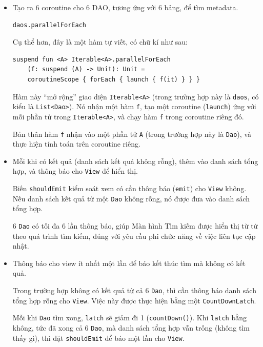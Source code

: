 \documentclass[../../thesis]{subfiles}
\begin{document}
\begin{itemize}
    \item
        Tạo ra 6 coroutine cho 6 DAO, tương ứng với 6 bảng, để tìm metadata.

        \begin{verbatim}
daos.parallelForEach
        \end{verbatim}

        Cụ thể hơn, đây là một hàm tự viết, có chữ kí như sau:

        \begin{verbatim}
suspend fun <A> Iterable<A>.parallelForEach
    (f: suspend (A) -> Unit): Unit =
    coroutineScope { forEach { launch { f(it) } } }
        \end{verbatim}

        Hàm này ``mở rộng'' giao diện \texttt{Iterable<A>} (trong trường hợp này
        là \texttt{daos}, có kiểu là \texttt{List<Dao>}). Nó nhận một hàm
        \texttt{f}, tạo một coroutine (\texttt{launch}) ứng với mỗi phần tử
        trong \texttt{Iterable<A>}, và chạy hàm \texttt{f} trong coroutine riêng
        đó.

        Bản thân hàm \texttt{f} nhận vào một phần tử \texttt{A} (trong trường
        hợp này là \texttt{Dao}), và thực hiện tính toán trên coroutine riêng.
    \item
        Mỗi khi có kết quả (danh sách kết quả không rỗng), thêm vào danh sách
        tổng hợp, và thông báo cho \texttt{View} để hiển thị.

        Biến \texttt{shouldEmit} kiểm soát xem có cần thông báo (\texttt{emit})
        cho \texttt{View} không. Nếu danh sách kết quả từ một \texttt{Dao} không
        rỗng, nó được đưa vào danh sách tổng hợp.

        6 \texttt{Dao} có tối đa 6 lần thông báo, giúp Màn hình Tìm kiếm được
        hiển thị từ từ theo quá trình tìm kiếm, đúng với yêu cầu phi chức năng
        về việc liên tục cập nhật.
    \item
        Thông báo cho view ít nhất một lần để báo kết thúc tìm mà không có kết
        quả.

        Trong trường hợp không có kết quả từ cả 6 \texttt{Dao}, thì cần thông
        báo danh sách tổng hợp rỗng cho \texttt{View}. Việc này được thực hiện
        bằng một \texttt{CountDownLatch}.

        Mỗi khi \texttt{Dao} tìm xong, \texttt{latch} sẽ giảm đi 1
        (\texttt{countDown()}). Khi \texttt{latch} bằng không, tức đã xong cả 6
        \texttt{Dao}, mà danh sách tổng hợp vẫn trống (không tìm thấy gì), thì
        đặt \texttt{shouldEmit} để báo một lần cho \texttt{View}.


\end{itemize}
\end{document}
